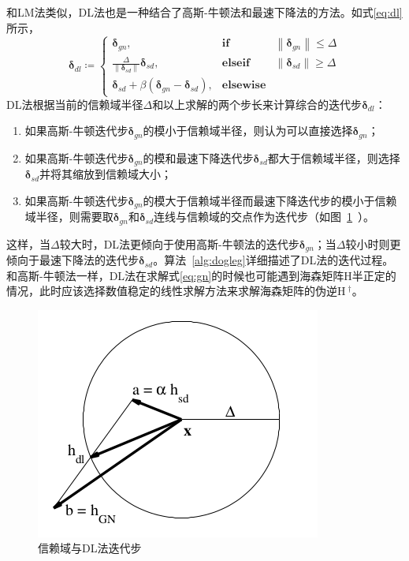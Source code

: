 和LM法类似，DL法也是一种结合了高斯-牛顿法和最速下降法的方法。如式\eqref{eq:dl}所示，
\begin{equation}
    \bm{\delta}_{dl} \coloneqq \left\{
        \begin{array}{lll}
            \bm{\delta}_{gn}, & \textbf{if} & \left\|\bm{\delta}_{gn}\right\| \leq \Delta \\
            \frac{\Delta}{\left\|\bm{\delta}_{sd}\right\|}\bm{\delta}_{sd}, &
            \textbf{elseif} & \left\|\bm{\delta}_{sd}\right\| \geq \Delta \\
            \bm{\delta}_{sd} + \beta(\bm{\delta}_{gn}-\bm{\delta}_{sd}), & \textbf{elsewise}
        \end{array}
    \right.
    \label{eq:dl}
\end{equation}
DL法根据当前的信赖域半径$\Delta$和以上求解的两个步长来计算综合的迭代步$\bm{\delta}_{dl}$：
\begin{enumerate}
    \item 如果高斯-牛顿迭代步$\bm{\delta}_{gn}$的模小于信赖域半径，则认为可以直接选择$\bm{\delta}_{gn}$；
    \item 如果高斯-牛顿迭代步$\bm{\delta}_{gn}$的模和最速下降迭代步$\bm{\delta}_{sd}$都大于信赖域半径，则选择$\bm{\delta}_{sd}$并将其缩放到信赖域大小；
    \item 如果高斯-牛顿迭代步$\bm{\delta}_{gn}$的模大于信赖域半径而最速下降迭代步的模小于信赖域半径，则需要取$\bm{\delta}_{gn}$和$\bm{\delta}_{sd}$连线与信赖域的交点作为迭代步（如图~\ref{fig:dogleg_step}~）。
\end{enumerate}
这样，当$\Delta$较大时，DL法更倾向于使用高斯-牛顿法的迭代步$\bm{\delta}_{gn}$；当$\Delta$较小时则更倾向于最速下降法的迭代步$\bm{\delta}_{sd}$。算法~\ref{alg:dogleg}详细描述了DL法的迭代过程。和高斯-牛顿法一样，DL法在求解式\eqref{eq:gn}的时候也可能遇到海森矩阵$\mathrm{H}$半正定的情况，此时应该选择数值稳定的线性求解方法来求解海森矩阵的伪逆$\mathrm{H}~^\dag$。

\begin{figure}[htb!]
    \centering
    \includegraphics[width=.3\textwidth]{Pictures/dogleg_step.png}
    \caption{信赖域与DL法迭代步\citep{tingleff2004methods}}
    \label{fig:dogleg_step}
\end{figure}

